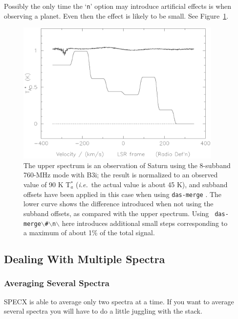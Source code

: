 \documentclass[11pt,twoside]{article}
\newcommand{\ie}{{\it i.e.}}
\newcommand{\dm}{{\tt das-merge}}
\begin{document}
Possibly the only time the `{\tt n}' option may introduce artificial
effects is when observing a planet.  Even then the effect is likely to
be small. See Figure~\ref{fig:merge_diffs}.
%
\begin{figure}[ht]
\centering
\includegraphics[width=4.0in]{sc8_merge_diffs.ps}
\vspace*{-0.5cm}
\begin{center}
\begin{minipage}[t]{5in}
\caption[\dm\ and planets]
{\small{The upper spectrum is an observation of Saturn using the
8-subband 760-MHz mode with B3i; the result is normalized to an
observed value of 90 K T$^*_a$ (\ie\ the actual value is about 45 K),
and subband offsets have been applied in this case when using \dm
. The lower curve shows the difference introduced when not using the
subband offsets, as compared with the upper spectrum. Using {\tt
das-merge$\backslash$\#$\backslash$n$\backslash$} here introduces
additional small steps corresponding to a maximum of about 1\% of the
total signal.}}
\label{fig:merge_diffs}
\end{minipage}
\end{center}
\end{figure}
%



\subsection{Dealing With Multiple Spectra}
\label{sec:specx_8}
\subsubsection{Averaging Several Spectra}
\label{sec:specx_8.2}

SPECX is able to average only two spectra at a time.  If you want to
average several spectra you will have to do a little juggling with the
stack.
\end{document}
